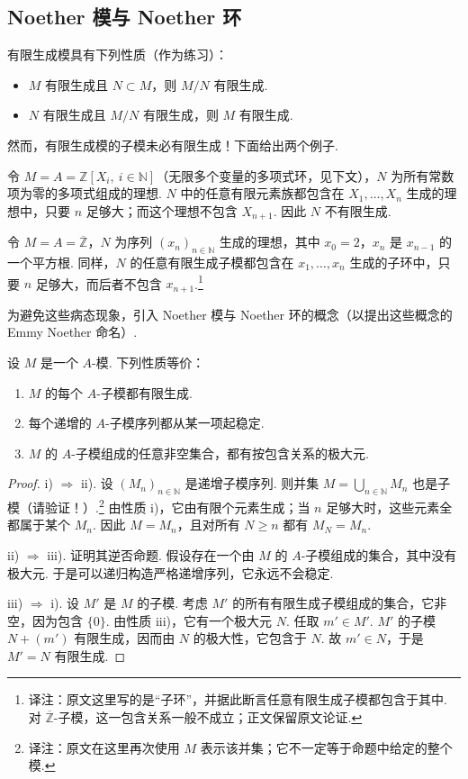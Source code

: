 \subsection{Noether 模与 Noether 环}\label{sec:galois-1-3-7}
有限生成模具有下列性质（作为练习）：
\begin{itemize}
\item $M$ 有限生成且 $N\subset M$，则 $M/N$ 有限生成.
\item $N$ 有限生成且 $M/N$ 有限生成，则 $M$ 有限生成.
\end{itemize}
然而，有限生成模的子模未必有限生成！下面给出两个例子.
\begin{example*}
令 $M=A=\mathbb Z[X_i,\ i\in\mathbb N]$（无限多个变量的多项式环，见下文），$N$ 为所有常数项为零的多项式组成的理想. $N$ 中的任意有限元素族都包含在 $X_1,\ldots,X_n$ 生成的理想中，只要 $n$ 足够大；而这个理想不包含 $X_{n+1}$. 因此 $N$ 不有限生成.
\end{example*}
\begin{example*}
令 $M=A=\overline{\mathbb Z}$，$N$ 为序列 $(x_n)_{n\in\mathbb N}$ 生成的理想，其中 $x_0=2$，$x_n$ 是 $x_{n-1}$ 的一个平方根. 同样，$N$ 的任意有限生成子模都包含在 $x_1,\ldots,x_n$ 生成的子环中，只要 $n$ 足够大，而后者不包含 $x_{n+1}$.\footnote{译注：原文这里写的是``子环''，并据此断言任意有限生成子模都包含于其中. 对 $\overline{\mathbb Z}$-子模，这一包含关系一般不成立；正文保留原文论证.}
\end{example*}
为避免这些病态现象，引入 Noether 模与 Noether 环的概念（以提出这些概念的 Emmy Noether 命名）.
\begin{proposition*}
设 $M$ 是一个 $A$-模. 下列性质等价：
\begin{enumerate}[label=\roman*)]
\item $M$ 的每个 $A$-子模都有限生成.
\item 每个递增的 $A$-子模序列都从某一项起稳定.
\item $M$ 的 $A$-子模组成的任意非空集合，都有按包含关系的极大元.
\end{enumerate}
\end{proposition*}
\begin{proof}
i) $\Rightarrow$ ii). 设 $(M_n)_{n\in\mathbb N}$ 是递增子模序列. 则并集 $M=\bigcup_{n\in\mathbb N}M_n$ 也是子模（请验证！）.\footnote{译注：原文在这里再次使用 $M$ 表示该并集；它不一定等于命题中给定的整个模.} 由性质 i)，它由有限个元素生成；当 $n$ 足够大时，这些元素全都属于某个 $M_n$. 因此 $M=M_n$，且对所有 $N\geqslant n$ 都有 $M_N=M_n$.

ii) $\Rightarrow$ iii). 证明其逆否命题. 假设存在一个由 $M$ 的 $A$-子模组成的集合，其中没有极大元. 于是可以递归构造严格递增序列，它永远不会稳定.

iii) $\Rightarrow$ i). 设 $M'$ 是 $M$ 的子模. 考虑 $M'$ 的所有有限生成子模组成的集合，它非空，因为包含 $\{0\}$. 由性质 iii)，它有一个极大元 $N$. 任取 $m'\in M'$. $M'$ 的子模 $N+(m')$ 有限生成，因而由 $N$ 的极大性，它包含于 $N$. 故 $m'\in N$，于是 $M'=N$ 有限生成.
\end{proof}
